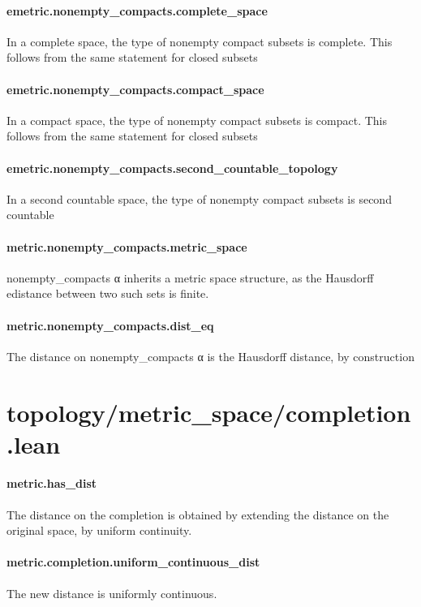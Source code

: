\documentclass{article}
\begin{document}
\paragraph{emetric.nonempty\_compacts.complete\_space}
\par
In a complete space, the type of nonempty compact subsets is complete. This follows
from the same statement for closed subsets
\paragraph{emetric.nonempty\_compacts.compact\_space}
\par
In a compact space, the type of nonempty compact subsets is compact. This follows from
the same statement for closed subsets
\paragraph{emetric.nonempty\_compacts.second\_countable\_topology}
\par
In a second countable space, the type of nonempty compact subsets is second countable
\paragraph{metric.nonempty\_compacts.metric\_space}
\par
\colorbox[RGB]{253,246,227}{{{{\color[RGB]{101, 123, 131} nonempty\_compacts α }}}} inherits a metric space structure, as the Hausdorff
edistance between two such sets is finite.
\paragraph{metric.nonempty\_compacts.dist\_eq}
\par
The distance on 
\colorbox[RGB]{253,246,227}{{{{\color[RGB]{101, 123, 131} nonempty\_compacts α }}}} is the Hausdorff distance, by construction
\section{topology/metric\_space/completion.lean}\paragraph{metric.has\_dist}
\par
The distance on the completion is obtained by extending the distance on the original space,
by uniform continuity.
\paragraph{metric.completion.uniform\_continuous\_dist}
\par
The new distance is uniformly continuous.
\end{document}
